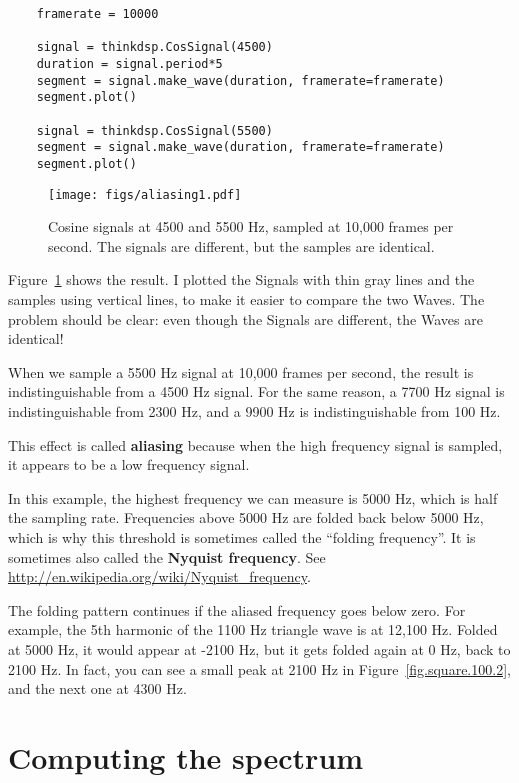 \begin{verbatim}
	framerate = 10000
	
	signal = thinkdsp.CosSignal(4500)
	duration = signal.period*5
	segment = signal.make_wave(duration, framerate=framerate)
	segment.plot()
	
	signal = thinkdsp.CosSignal(5500)
	segment = signal.make_wave(duration, framerate=framerate)
	segment.plot()
\end{verbatim}

\begin{figure}
	\centerline{\texttt{[image: figs/aliasing1.pdf]}}
	\caption{Cosine signals at 4500 and 5500 Hz, sampled at 10,000 frames
		per second.  The signals are different, but the samples are identical.}
	\label{fig.aliasing1}
\end{figure}

Figure~\ref{fig.aliasing1} shows the result.  I plotted the Signals
with thin gray lines and the samples using vertical lines,
to make it easier to compare the
two Waves.  The problem
should be clear: even though the Signals are different, the
Waves are identical!

When we sample a 5500 Hz signal at 10,000 frames per second, the
result is indistinguishable from a 4500 Hz signal.
For the same reason, a 7700 Hz signal is indistinguishable
from 2300 Hz, and a 9900 Hz is indistinguishable from 100 Hz.

This effect is called {\bf aliasing} because when the high frequency
signal is sampled, it appears to be a low frequency signal.

In this example, the highest frequency we can measure is 5000 Hz,
which is half the sampling rate.  Frequencies above 5000 Hz are folded
back below 5000 Hz, which is why this threshold is sometimes called
the ``folding frequency''.  It is sometimes also called the {\bf
	Nyquist frequency}.  See
\url{http://en.wikipedia.org/wiki/Nyquist_frequency}.

The folding pattern continues if the aliased frequency goes below
zero.  For example, the 5th harmonic of the 1100 Hz triangle wave is
at 12,100 Hz.  Folded at 5000 Hz, it would appear at -2100 Hz, but it
gets folded again at 0 Hz, back to 2100 Hz.  In fact, you can see a
small peak at 2100 Hz in Figure~\ref{fig.square.100.2}, and the next
one at 4300 Hz.


\section{Computing the spectrum}

